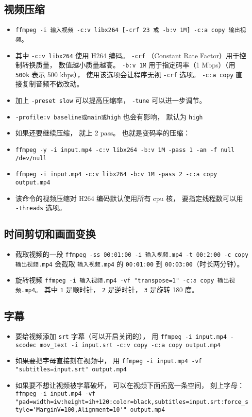 \subsection{视频压缩}
\begin{itemize}
\item \verb`ffmpeg -i 输入视频 -c:v libx264 [-crf 23 或 -b:v 1M] -c:a copy 输出视频`。
\item 其中 \verb`-c:v libx264` 使用 H264 编码。 \verb`-crf` （Constant Rate Factor）用于控制转换质量， 数值越小质量越高。 \verb`-b:v 1M` 用于指定码率（1 Mbps）（用 \verb`500k` 表示 500 kbps）， 使用该选项会让程序无视 \verb`-crf` 选项。 \verb`-c:a copy` 直接复制音频不做改动。
\item 加上 \verb`-preset slow` 可以提高压缩率， \verb`-tune` 可以进一步调节。
\item \verb`-profile:v baseline或main或high` 也会有影响， 默认为 \verb`high`
\item 如果还要继续压缩， 就上 2 pass。 也就是变码率的压缩：
\item \verb`ffmpeg -y -i input.mp4 -c:v libx264 -b:v 1M -pass 1 -an -f null /dev/null`
\item \verb`ffmpeg -i input.mp4 -c:v libx264 -b:v 1M -pass 2 -c:a copy output.mp4`
\item 该命令的视频压缩对 H264 编码默认使用所有 cpu 核， 要指定线程数可以用 \verb`-threads` 选项。
\end{itemize}

\subsection{时间剪切和画面变换}
\begin{itemize}
\item 截取视频的一段 \verb`ffmpeg -ss 00:01:00 -i 输入视频.mp4 -t 00:2:00 -c copy 输出视频.mp4` 会截取 \verb`输入视频.mp4` 的 \verb`00:01:00` 到 \verb`00:03:00`（时长两分钟）。
\item 旋转视频 \verb`ffmpeg -i 输入视频.mp4 -vf "transpose=1" -c:a copy 输出视频.mp4`。 其中 \verb`1` 是顺时针， \verb`2` 是逆时针， \verb`3` 是旋转 180 度。

\end{itemize}

\subsection{字幕}
\begin{itemize}
\item 要给视频添加 \verb`srt` 字幕（可以开启关闭的）， 用 \verb`ffmpeg -i input.mp4 -scodec mov_text -i input.srt -c:v copy -c:a copy output.mp4`
\item 如果要把字母直接刻在视频中， 用 \verb`ffmpeg -i input.mp4 -vf "subtitles=input.srt" output.mp4`
\item 如果要不想让视频被字幕破坏， 可以在视频下面拓宽一条空间， 刻上字母： \verb`ffmpeg -i input.mp4 -vf "pad=width=iw:height=ih+120:color=black,subtitles=input.srt:force_style='MarginV=100,Alignment=10'" output.mp4`
\end{itemize}
